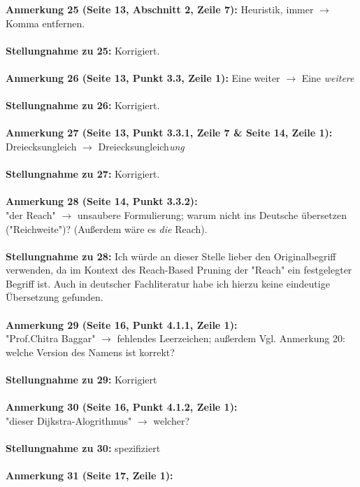 \documentclass[a4paper,12pt]{book}
\begin{document}
\noindent
\textbf{Anmerkung 25 (Seite 13, Abschnitt 2, Zeile 7):}
Heuristik\emph{,} immer $\rightarrow$ Komma entfernen. 
\\ \\
\textbf{Stellungnahme zu 25:}
Korrigiert.
\\ \\
\noindent
\textbf{Anmerkung 26 (Seite 13, Punkt 3.3, Zeile 1):}
Eine weiter $\rightarrow$ Eine \emph{weitere}
\\ \\
\textbf{Stellungnahme zu 26:}
Korrigiert.
\\ \\
\noindent
\textbf{Anmerkung 27 (Seite 13, Punkt 3.3.1, Zeile 7 \& Seite 14, Zeile 1):}\\
Dreiecksungleich $\rightarrow$ Dreiecksungleich\emph{ung} 
\\ \\
\textbf{Stellungnahme zu 27:}
Korrigiert.
\\ \\
\noindent
\textbf{Anmerkung 28 (Seite 14, Punkt 3.3.2):}\\
"der Reach" $\rightarrow$ unsaubere Formulierung; warum nicht ins Deutsche übersetzen ("Reichweite")? (Außerdem wäre es \emph{die} Reach). 
\\ \\
\textbf{Stellungnahme zu 28:}
Ich würde an dieser Stelle lieber den Originalbegriff verwenden, da im Kontext des Reach-Based Pruning der "Reach" ein festgelegter Begriff ist. Auch in deutscher Fachliteratur habe ich hierzu keine eindeutige Übersetzung gefunden.
\\ \\
\noindent
\textbf{Anmerkung 29 (Seite 16, Punkt 4.1.1, Zeile 1):}\\
"Prof.Chitra Baggar" $\rightarrow$ fehlendes Leerzeichen; außerdem Vgl. Anmerkung 20: welche Version des Namens ist korrekt?\\ \\
\textbf{Stellungnahme zu 29:} Korrigiert
\\ \\
\noindent
\textbf{Anmerkung 30 (Seite 16, Punkt 4.1.2, Zeile 1):}\\
"dieser Dijkstra-Alogrithmus" $\rightarrow$ welcher? \\ \\
\textbf{Stellungnahme zu 30:} spezifiziert
\\ \\
\noindent
\textbf{Anmerkung 31 (Seite 17, Zeile 1):}\\
\end{document}
